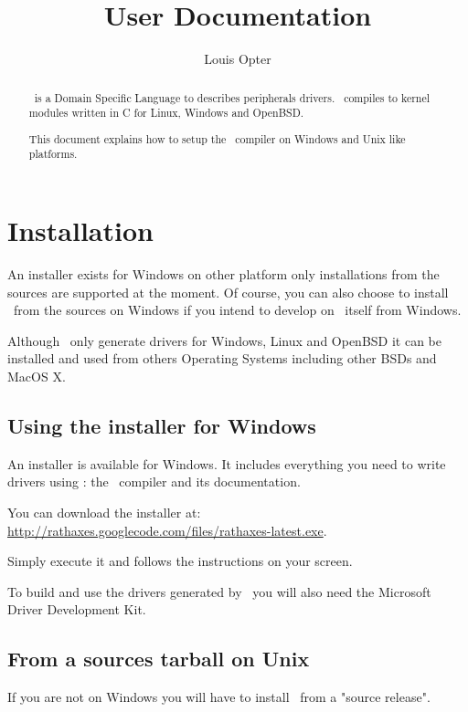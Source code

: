 \documentclass[american]{rtxarticle}
\title{User Documentation}
\author{Louis Opter}
\begin{document}
\maketitle

\begin{abstract}
\rtx\ is a Domain Specific Language to describes peripherals drivers. \rtx\
compiles to kernel modules written in C for Linux, Windows and OpenBSD.

This document explains how to setup the \rtx\ compiler on Windows and Unix like
platforms.
\end{abstract}

\rtxmaketitleblock

\tableofcontents

\section{Installation}

An installer exists for Windows on other platform only installations from the
sources are supported at the moment. Of course, you can also choose to install
\rtx\ from the sources on Windows if you intend to develop on \rtx\ itself from
Windows.

Although \rtx\ only generate drivers for Windows, Linux and OpenBSD it can be
installed and used from others Operating Systems including other BSDs and MacOS
X.

\subsection{Using the installer for Windows}

An installer is available for Windows. It includes everything you need to write
drivers using \rtx: the \rtx\ compiler and its documentation.

You can download the installer at: \url{http://rathaxes.googlecode.com/files/rathaxes-latest.exe}.

Simply execute it and follows the instructions on your screen.

To build and use the drivers generated by \rtx\ you will also need the
Microsoft Driver Development Kit.

\subsection{From a sources tarball on Unix}

If you are not on Windows you will have to install \rtx\ from a "source
release".
\end{document}
